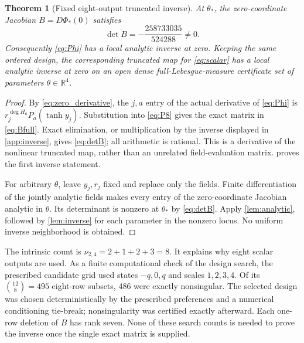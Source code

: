 \documentclass[11pt,a4paper]{article}
\numberwithin{equation}{section}
\newtheorem{theorem}{Theorem}[section]
\theoremstyle{definition}
\theoremstyle{remark}
\newcommand{\R}{\mathbb R}
\begin{document}
\begin{theorem}[Fixed eight-output truncated inverse]\label{thm:eight}
At $\theta_*$, the zero-coordinate Jacobian $B=D\Phi_*(0)$ satisfies
\begin{equation}\label{eq:detB}
 \det B=-\frac{258733035}{524288}\ne0.
\end{equation}
Consequently \eqref{eq:Phi} has a local analytic inverse at zero. Keeping
the same ordered design, the corresponding truncated map for
\eqref{eq:scalar} has a local analytic inverse at zero on an open dense
full-Lebesgue-measure certificate set of parameters $\theta\in\R^4$.
\end{theorem}
\begin{proof}
By \eqref{eq:zero_derivative}, the $j,a$ entry of the actual derivative
of \eqref{eq:Phi} is $r_j^{\deg H_a}P_a(\tanh y_j)$. Substitution into
\eqref{eq:P8} gives the exact matrix in \cref{eq:Bfull}. Exact elimination,
or multiplication by the inverse displayed in \cref{app:inverse}, gives
\eqref{eq:detB}; all arithmetic is rational. This is a derivative of the
nonlinear truncated map, rather than an unrelated field-evaluation matrix.
 proves the first inverse statement.

For arbitrary $\theta$, leave $y_j,r_j$ fixed and replace only the fields.
Finite differentiation of the jointly analytic fields makes every entry
of the zero-coordinate Jacobian analytic in $\theta$. Its determinant
is nonzero at $\theta_*$ by \eqref{eq:detB}. Apply
\cref{lem:analytic}, followed by \cref{lem:inverse} for each parameter
in the nonzero locus. No uniform inverse neighborhood is obtained.
\end{proof}

The intrinsic count is $\nu_{2,4}=2+1+2+3=8$. It explains why eight
scalar outputs are used. As a finite computational check of the design
search, the prescribed candidate grid used states $-q,0,q$ and scales
$1,2,3,4$. Of its $\binom{12}{8}=495$ eight-row subsets, 486 were exactly
nonsingular. The selected design was chosen deterministically by the
prescribed preferences and a numerical conditioning tie-break; nonsingularity
was certified exactly afterward. Each one-row deletion of $B$ has rank
seven. None of these search counts is needed to prove the inverse once
the single exact matrix is supplied.
\end{document}
